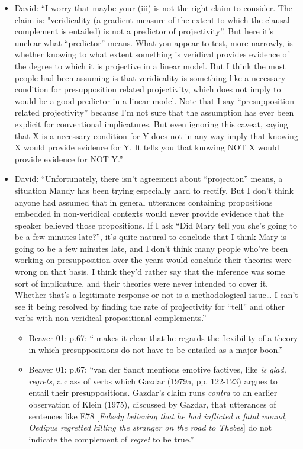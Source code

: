 \documentclass[11pt,fleqn]{article}
\newcommand{\6}{\mbox{$[\hspace*{-.6mm}[$}}
\newcommand{\9}{\mbox{$]\hspace*{-.6mm}]$}}
\begin{document}
{\begin{itemize}
\begin{itemize}
\item David: ``I worry that maybe your (iii) is not the right claim to consider. The claim is: "veridicality (a gradient measure of the extent to which the clausal complement is entailed) is not a predictor of projectivity”. But here it’s unclear what “predictor” means. What you appear to test, more narrowly, is whether knowing to what extent something is veridical provides evidence of the degree to which it is projective in a linear model. But I think the most people had been assuming is that veridicality is something like a necessary condition for presupposition related projectivity, which does not imply to would be a good predictor in a linear model. Note that I say “presupposition related projectivity” because I’m not sure that the assumption has ever been explicit for conventional implicatures. But even ignoring this caveat, saying that X is a necessary condition for Y does not in any way imply that knowing X would provide evidence for Y. It tells you that knowing NOT X would provide evidence for NOT Y.''

\item David: ``Unfortunately, there isn’t agreement about  “projection” means, a situation Mandy has been trying especially hard to rectify. But I don’t think anyone had assumed that in general utterances containing propositions embedded in non-veridical contexts would never provide evidence that the speaker believed those propositions. If I ask “Did Mary tell you she’s going to be a few minutes late?”, it’s quite natural to conclude that I think Mary is going to be a few minutes late, and I don’t think many people who’ve been working on presupposition over the years would conclude their theories were wrong on that basis. I think they’d rather say that the inference was some sort of implicature, and their theories were never intended to cover it. Whether that’s a legitimate response or not is a methodological issue… I can’t see it being resolved by finding the rate of projectivity for “tell” and other verbs with non-veridical propositional complements.''

\begin{itemize}

\item Beaver 01: p.67: ``\citealt[196-198]{vds88} makes it clear that he regards the flexibility of a theory in which presuppositions do not have to be entailed as a major boon.''

\item Beaver 01: p.67: ``van der Sandt mentions emotive factives, like {\em is glad, regrets}, a class of verbs which Gazdar (1979a, pp. 122-123) argues to entail their presuppositions. Gazdar's claim runs {\em contra} to an earlier observation of Klein (1975), discussed by Gazdar, that utterances of sentences like E78 [{\em Falsely believing that he had inflicted a fatal wound, Oedipus regretted killing the stranger on the road to Thebes}] do not indicate the complement of {\em regret} to be true.''


\end{itemize}
\end{itemize}
\end{itemize}}
\end{document}
